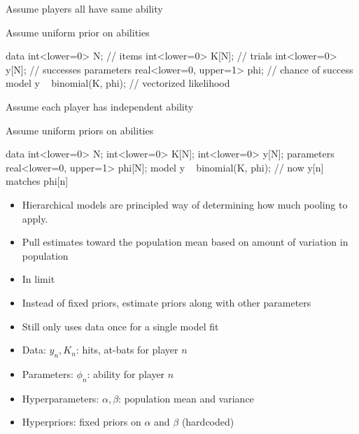 \documentclass[10pt]{report}
\begin{document}
%
\begin{subitemize}
\item Assume players all have same ability
\item Assume uniform prior on abilities
\begin{stancode}
data {
  int<lower=0> N;              // items
  int<lower=0> K[N];           // trials
  int<lower=0> y[N];           // successes
}
parameters {
  real<lower=0, upper=1> phi;  // chance of success
}
model {
  y ~ binomial(K, phi);        // vectorized likelihood
}
\end{stancode}
\end{subitemize}


%
\begin{subitemize}
\item Assume each player has independent ability
\item Assume uniform priors on abilities
\begin{stancode}
data {
  int<lower=0> N;
  int<lower=0> K[N];
  int<lower=0> y[N];
}
parameters {
  real<lower=0, upper=1> phi[N];
}
model {
  y ~ binomial(K, phi);  // now y[n] matches phi[n]
}
\end{stancode}
\end{subitemize}


%
\begin{itemize}
\item Hierarchical models are principled way of determining how much
  pooling to apply.
\item Pull estimates toward the population mean based on amount of
  variation in population
\item In limit
\end{itemize}


%
\begin{itemize}
\item Instead of fixed priors, estimate priors along with other parameters
\item Still only uses data once for a single model fit
\item Data: $y_n, K_n$: hits, at-bats for player $n$
\item Parameters: $\phi_n$: ability for player $n$
\item Hyperparameters: $\alpha, \beta$: population mean and variance
\item Hyperpriors: fixed priors on $\alpha$ and $\beta$ (hardcoded)
\end{itemize}
\end{document}
